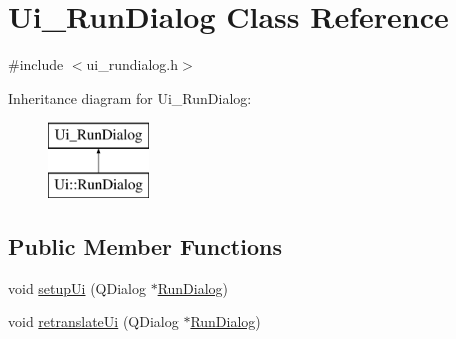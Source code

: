 \hypertarget{class_ui___run_dialog}{}\section{Ui\+\_\+\+Run\+Dialog Class Reference}
\label{class_ui___run_dialog}


{\ttfamily \#include $<$ui\+\_\+rundialog.\+h$>$}

Inheritance diagram for Ui\+\_\+\+Run\+Dialog\+:\begin{figure}[H]
\begin{center}
\leavevmode
\includegraphics[height=2.000000cm]{d8/d15/class_ui___run_dialog}
\end{center}
\end{figure}
\subsection*{Public Member Functions}
\begin{DoxyCompactItemize}
\item 
void \mbox{\hyperlink{class_ui___run_dialog_ad12028ae8d0300e6b5f4c2a0daa3a989}{setup\+Ui}} (Q\+Dialog $\ast$\mbox{\hyperlink{class_run_dialog}{Run\+Dialog}})
\item 
void \mbox{\hyperlink{class_ui___run_dialog_abcad95b8ac18d97a7331334555654930}{retranslate\+Ui}} (Q\+Dialog $\ast$\mbox{\hyperlink{class_run_dialog}{Run\+Dialog}})
\end{DoxyCompactItemize}
